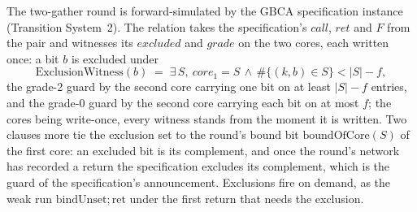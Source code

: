 \begin{theorem}
  \label{thm:gbca-round-refines-specification}
  \leanok
  The two-gather round is forward-simulated by the GBCA specification instance (Transition System~2).
  The relation takes the specification's $call$, $ret$ and $F$ from the pair and witnesses its $excluded$ and $grade$ on the two cores, each written once: a bit $b$ is excluded under
  \[
    \mathrm{ExclusionWitness}(b) \;=\; \exists\, S,\ core_1 = S \,\wedge\, \#\{(k, b) \in S\} < |S| - f,
  \]
  the grade-2 guard by the second core carrying one bit on at least $|S| - f$ entries, and the grade-0 guard by the second core carrying each bit on at most $f$; the cores being write-once, every witness stands from the moment it is written.
  Two clauses more tie the exclusion set to the round's bound bit $\mathrm{boundOfCore}(S)$ of the first core: an excluded bit is its complement, and once the round's network has recorded a return the specification excludes its complement, which is the guard of the specification's announcement.
  Exclusions fire on demand, as the weak run $\mathrm{bindUnset}; \mathrm{ret}$ under the first return that needs the exclusion.
\end{theorem}

